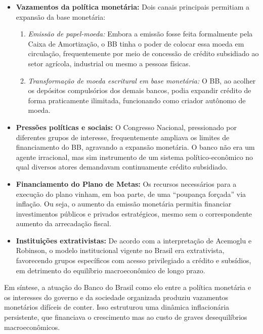 \documentclass[a4paper,12pt]{article}[abntex2]
\begin{document}
\begin{itemize}
    \item \textbf{Vazamentos da política monetária:} 
    Dois canais principais permitiam a expansão da base monetária:
    \begin{enumerate}
        \item \textit{Emissão de papel-moeda:} Embora a emissão fosse feita formalmente pela Caixa de Amortização, o BB tinha o poder de colocar essa moeda em circulação, frequentemente por meio de concessão de crédito subsidiado ao setor agrícola, industrial ou mesmo a pessoas físicas.
        \item \textit{Transformação de moeda escritural em base monetária:} O BB, ao acolher os depósitos compulsórios dos demais bancos, podia expandir crédito de forma praticamente ilimitada, funcionando como criador autônomo de moeda.
    \end{enumerate}

    \item \textbf{Pressões políticas e sociais:} O Congresso Nacional, pressionado por diferentes grupos de interesse, frequentemente ampliava os limites de financiamento do BB, agravando a expansão monetária. O banco não era um agente irracional, mas sim instrumento de um sistema político-econômico no qual diversos atores demandavam continuamente crédito subsidiado.

    \item \textbf{Financiamento do Plano de Metas:} Os recursos necessários para a execução do plano vinham, em boa parte, de uma ``poupança forçada'' via inflação. Ou seja, o aumento da emissão monetária permitia financiar investimentos públicos e privados estratégicos, mesmo sem o correspondente aumento da arrecadação fiscal.

    \item \textbf{Instituições extrativistas:} De acordo com a interpretação de Acemoglu e Robinson, o modelo institucional vigente no Brasil era extrativista, favorecendo grupos específicos com acesso privilegiado a crédito e subsídios, em detrimento do equilíbrio macroeconômico de longo prazo.
\end{itemize}

Em síntese, a atuação do Banco do Brasil como elo entre a política monetária e os interesses do governo e da sociedade organizada produziu vazamentos monetários difíceis de conter. Isso estruturou uma dinâmica inflacionária persistente, que financiava o crescimento mas ao custo de graves desequilíbrios macroeconômicos.
\end{document}

